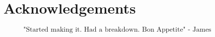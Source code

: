 \chapter{Acknowledgements}


\begin{figure}[b]
$$\mbox{"Started making it. Had a breakdown. Bon Appetite" - James Acaster}$$
\end{figure}

